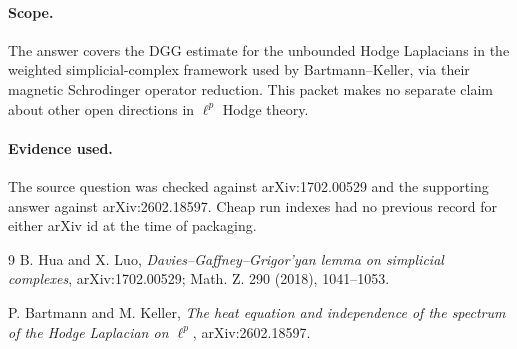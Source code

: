\documentclass[11pt]{article}
\begin{document}
\paragraph{Scope.}
The answer covers the DGG estimate for the unbounded Hodge Laplacians in the
weighted simplicial-complex framework used by Bartmann--Keller, via their
magnetic Schrodinger operator reduction.  This packet makes no separate claim
about other open directions in $\ell^p$ Hodge theory.

\paragraph{Evidence used.}
The source question was checked against arXiv:1702.00529 and the supporting
answer against arXiv:2602.18597.  Cheap run indexes had no previous record for
either arXiv id at the time of packaging.

\begin{thebibliography}{9}
B. Hua and X. Luo, \emph{Davies--Gaffney--Grigor'yan lemma on simplicial complexes},
arXiv:1702.00529; Math. Z. 290 (2018), 1041--1053.

P. Bartmann and M. Keller, \emph{The heat equation and independence of the spectrum
of the Hodge Laplacian on $\ell^p$}, arXiv:2602.18597.
\end{thebibliography}
\end{document}
